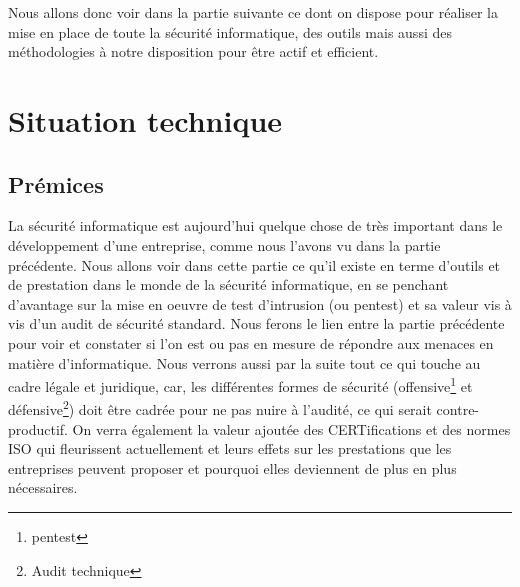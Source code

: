 \documentclass[a4paper]{memoir}
\begin{document}
Nous allons donc voir dans la partie suivante ce dont on dispose pour réaliser la mise en place de toute la sécurité informatique, des outils mais aussi des méthodologies à notre disposition pour être actif et efficient.

\part{Situation technique}

\chapter{Prémices}

La sécurité informatique est aujourd'hui quelque chose de très important dans le développement d'une entreprise, comme nous l'avons vu dans la partie précédente. Nous allons voir dans cette partie ce qu'il existe en terme d'outils et de prestation dans le monde de la sécurité informatique, en se penchant d'avantage sur la mise en oeuvre de test d'intrusion (ou pentest) et sa valeur vis à vis d'un audit de sécurité standard. Nous ferons le lien entre la partie précédente pour voir et constater si l'on est ou pas en mesure de répondre aux menaces en matière d'informatique. Nous verrons aussi par la suite tout ce qui touche au cadre légale et juridique, car, les différentes formes de sécurité (offensive\footnote{pentest} et défensive\footnote{Audit technique}) doit être cadrée pour ne pas nuire à l'audité, ce qui serait contre-productif. On verra également la valeur ajoutée des CERTifications et des normes ISO qui fleurissent actuellement et leurs effets sur les prestations que les entreprises peuvent proposer et pourquoi elles deviennent de plus en plus nécessaires.\\ 
\end{document}
